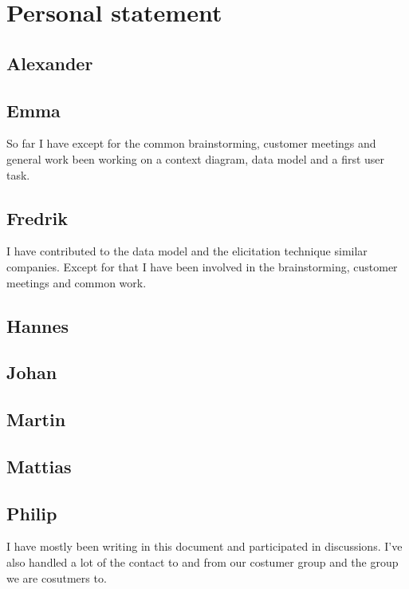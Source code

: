 \documentclass[a4paper]{article}
\begin{document}
  \section{Personal statement}
  
  \subsection{Alexander}
  \subsection{Emma}
	So far I have except for the common brainstorming, customer meetings and general work been working on a context diagram, data model and a first user task.	
  \subsection{Fredrik}
  	I have contributed to the data model and the elicitation technique similar companies. Except for that I have been involved in the brainstorming, customer meetings and common work. 
  \subsection{Hannes}
  \subsection{Johan}
  \subsection{Martin}
  \subsection{Mattias}
  \subsection{Philip}
  I have mostly been writing in this document and participated in discussions. 
  I've also handled a lot of the contact to and from our costumer group and the group we are cosutmers to.
\end{document}
